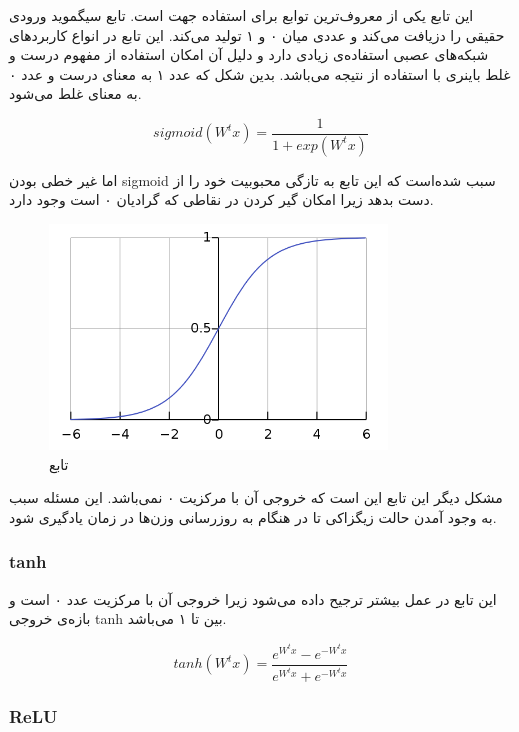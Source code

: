 \documentclass[12pt, a4paper, oneside]{report}
\begin{document}
این تابع یکی از معروف‌ترین توابع برای استفاده جهت
‌است. تابع سیگموید ورودی حقیقی را دزیافت می‌کند و عددی میان ۰ و ۱ تولید می‌کند. این تابع در انواع کاربرد‌های شبکه‌‌های
عصبی استفاده‌ی زیادی دارد و دلیل آن امکان استفاده از مفهوم درست و غلط باینری با استفاده از نتیجه می‌باشد. بدین شکل که
عدد ۱ به معنای درست و عدد ۰ به معنای غلط می‌شود.

\begin{equation}
    sigmoid(W^tx) = \dfrac{1}{1 + exp(W^tx)}
\label{formula:sigmoid}
\end{equation}

اما غیر خطی بودن
sigmoid
سبب شده‌است که این تابع به تازگی محبوبیت خود را از دست بدهد زیرا امکان گیر کردن در نقاطی که گرادیان ۰ است وجود دارد.

\begin{figure}[h]
    \centering
    \includegraphics[width=0.80\textwidth]{sigmoid}
    \caption{تابع }
    \label{fig:sigmoid}
\end{figure}

مشکل دیگر این تابع این است که خروجی آن با مرکزیت ۰ نمی‌باشد. این مسئله سبب به وجود آمدن حالت زیگزاکی
تا در هنگام به روزرسانی وزن‌ها در زمان یادگیری شود.

\subsubsection{tanh}

این تابع در عمل بیشتر ترجیح داده می‌شود زیرا خروجی آن با مرکزیت عدد ۰ است و بازه‌ی خروجی
tanh
بین
تا ۱ می‌باشد.

\begin{equation}
    tanh(W^tx) = \dfrac{e^{W^tx} -e^{-W^tx}}{e^{W^tx} + e^{-W^tx}}
\label{formula:tanh}
\end{equation}

\subsubsection{ReLU}
\end{document}
